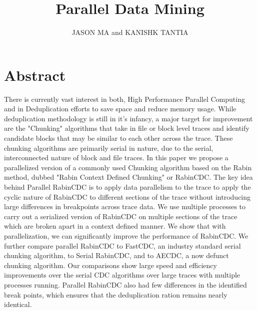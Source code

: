 \documentclass{acmtog} %
\begin{document}
	\title{Parallel Data Mining} %
	
	\author{JASON MA {\upshape and} KANISHK TANTIA
		}
	

	
	\maketitle
	\section{Abstract}
	There is currently vast interest in both, High Performance Parallel Computing and in Deduplication efforts to save space and reduce memory usage. While deduplication methodology is still in it's infancy, a major target for improvement are the "Chunking" algorithms that take in file or block level traces and identify candidate blocks that may be similar to each other across the trace. These chunking algorithms are primarily serial in nature, due to the serial, interconnected nature of block and file traces. In this paper we propose a parallelized version of a commonly used Chunking algorithm based on the Rabin method, dubbed "Rabin Context Defined Chunking" or RabinCDC. The key idea behind Parallel RabinCDC is to apply data parallelism to the trace to apply the cyclic nature of RabinCDC to different sections of the trace without introducing large differences in breakpoints across trace data. We use multiple processes to carry out a serialized version of RabinCDC on multiple sections of the trace which are broken apart in a context defined manner. We show that with parallelization, we can significantly improve the performance of RabinCDC. We further compare parallel RabinCDC to FastCDC, an industry standard serial chunking algorithm, to Serial RabinCDC, and to AECDC, a now defunct chunking algorithm. Our comparisons show large speed and efficiency improvements over the serial CDC algorithms over large traces with multiple processes running. Parallel RabinCDC also had few differences in the identified break points, which ensures that the deduplication ration remains nearly identical.
	
\end{document}
